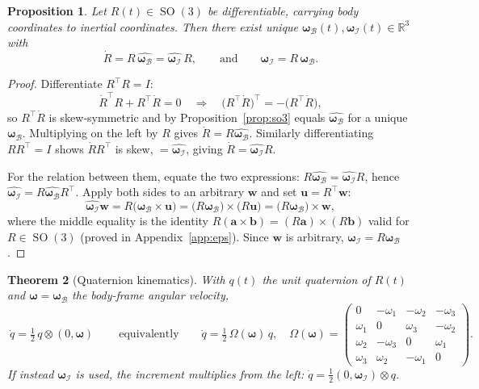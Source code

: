 \documentclass[11pt]{article}
\DeclareMathOperator{\SO}{SO}
\newcommand{\R}{\mathbb{R}}
\newcommand{\vv}[1]{\bm{#1}}
\newcommand{\hatmap}[1]{\widehat{#1}}
\theoremstyle{plain}
\newtheorem{theorem}{Theorem}[section]
\newtheorem{proposition}[theorem]{Proposition}
\theoremstyle{definition}
\begin{document}
\begin{proposition}\label{prop:Rdot}
Let $R(t)\in\SO(3)$ be differentiable, carrying body coordinates to inertial coordinates. Then
there exist unique $\bm\omega_{\mathcal B}(t),\bm\omega_{\mathcal I}(t)\in\R^3$ with
\[
\dot R=R\,\hatmap{\bm\omega_{\mathcal B}}=\hatmap{\bm\omega_{\mathcal I}}\,R ,
\qquad\text{and}\qquad \bm\omega_{\mathcal I}=R\,\bm\omega_{\mathcal B}.
\]
\end{proposition}

\begin{proof}
Differentiate $R^{\!\top}R=I$:
\[
\dot R^{\!\top}R+R^{\!\top}\dot R=0\quad\Longrightarrow\quad
\big(R^{\!\top}\dot R\big)^{\!\top}=-\big(R^{\!\top}\dot R\big),
\]
so $R^{\!\top}\dot R$ is skew-symmetric and by Proposition~\ref{prop:so3} equals
$\hatmap{\bm\omega_{\mathcal B}}$ for a unique $\bm\omega_{\mathcal B}$. Multiplying on the left by
$R$ gives $\dot R=R\hatmap{\bm\omega_{\mathcal B}}$. Similarly differentiating $RR^{\!\top}=I$ shows
$\dot RR^{\!\top}$ is skew, $=\hatmap{\bm\omega_{\mathcal I}}$, giving
$\dot R=\hatmap{\bm\omega_{\mathcal I}}R$.

For the relation between them, equate the two expressions:
$R\hatmap{\bm\omega_{\mathcal B}}=\hatmap{\bm\omega_{\mathcal I}}R$, hence
$\hatmap{\bm\omega_{\mathcal I}}=R\hatmap{\bm\omega_{\mathcal B}}R^{\!\top}$. Apply both sides to an
arbitrary $\vv w$ and set $\vv u=R^{\!\top}\vv w$:
\[
\hatmap{\bm\omega_{\mathcal I}}\vv w=R\big(\bm\omega_{\mathcal B}\times\vv u\big)
=\big(R\bm\omega_{\mathcal B}\big)\times\big(R\vv u\big)
=\big(R\bm\omega_{\mathcal B}\big)\times\vv w ,
\]
where the middle equality is the identity $R(\vv a\times\vv b)=(R\vv a)\times(R\vv b)$ valid for
$R\in\SO(3)$ (proved in Appendix~\ref{app:eps}). Since $\vv w$ is arbitrary,
$\bm\omega_{\mathcal I}=R\bm\omega_{\mathcal B}$.
\end{proof}

\begin{theorem}[Quaternion kinematics]\label{thm:qdot}
With $q(t)$ the unit quaternion of $R(t)$ and $\bm\omega=\bm\omega_{\mathcal B}$ the body-frame
angular velocity,
\[
\boxed{\ \dot q=\tfrac12\,q\otimes(0,\bm\omega)\ }
\qquad\text{equivalently}\qquad
\dot q=\tfrac12\,\Omega(\bm\omega)\,q,\quad
\Omega(\bm\omega)=\begin{pmatrix}
0&-\omega_1&-\omega_2&-\omega_3\\
\omega_1&0&\omega_3&-\omega_2\\
\omega_2&-\omega_3&0&\omega_1\\
\omega_3&\omega_2&-\omega_1&0
\end{pmatrix}.
\]
If instead $\bm\omega_{\mathcal I}$ is used, the increment multiplies from the left:
$\dot q=\tfrac12(0,\bm\omega_{\mathcal I})\otimes q$.
\end{theorem}
\end{document}
